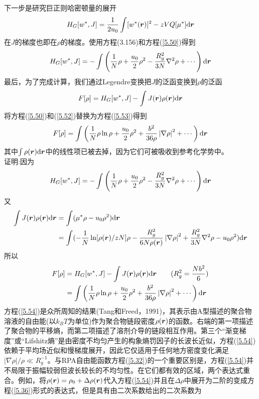 下一步是研究巨正则哈密顿量的展开
\begin{equation}
H_G[w^*,J]=\frac{1}{2u_0}\int[w^*(\bm{r})]^2-zVQ[\mu^*]\mathrm{d}\bm{r}
\end{equation}
在$J$的梯度也即在$\rho$的梯度。使用方程(3.156)和方程(\ref{5.50})得到
\begin{equation}\label{5.52}
H_G[w^*,J]=-\int\left(\frac{1}{N}\rho+\frac{u_0}{2}\rho^2-\frac{R_g^2}{3N}\nabla^2\rho+\cdots\right)\mathrm{d}\bm{r}
\end{equation}
最后，为了完成计算，我们通过Legendre变换把$J$的泛函变换到$\rho$的泛函
\begin{equation}\label{5.53}
F[\rho]=H_G[w^*,J]-\int J(\bm{r})\rho(\bm{r})\mathrm{d}\bm{r}
\end{equation}
将方程(\ref{5.50})和(\ref{5.52})替换为方程(\ref{5.53})得到
\begin{equation}\label{5.54}
F[\rho]=\int\left(\frac{1}{N}\rho\ln\rho+\frac{u_0}{2}\rho^2+\frac{b^2}{36\rho}\left|\nabla\rho\right|^2+\cdots\right)\mathrm{d}\bm{r}
\end{equation}
其中$\int\rho(\bm{r})\mathrm{d}\bm{r}$中的线性项已被去掉，因为它们可被吸收到参考化学势中。\\
证明:因为
\begin{equation*}
H_G[w^*,J]=-\int\left(\frac{1}{N}\rho+\frac{u_0}{2}\rho^2-\frac{R_g^2}{3N}\nabla^2\rho+\cdots\right)\mathrm{d}\bm{r}
\end{equation*}
又
\begin{equation*}
\begin{aligned}
\int J(\bm{r})\rho(\bm{r})\mathrm{d}\bm{r}&=\int(\mu^*\rho-u_0\rho^2)\mathrm{d}\bm{r}\\
&=\int(-\frac{1}{N}\ln[\rho(\bm{r})/zN]\rho-\frac{R_g^2}{6N\rho(\bm{r})}\left|\nabla\rho\right|^2+\frac{R_g^2}{3N}\nabla^2\rho-u_0\rho^2)\mathrm{d}\bm{r}
\end{aligned}
\end{equation*}
所以
\begin{equation*}
\begin{aligned}
F[\rho]&=H_G[w^*,J]-\int J(\bm{r})\rho(\bm{r})\mathrm{d}\bm{r}\qquad (R_g^2=\frac{Nb^2}{6})\\
&=\int\left(\frac{1}{N}\rho\ln\rho+\frac{u_0}{2}\rho^2+\frac{b^2}{36\rho}\left|\nabla\rho\right|^2+\cdots\right)\mathrm{d}\bm{r}
\end{aligned}
\end{equation*}
方程(\ref{5.54})是众所周知的结果(Tang和Freed，1991)，其表示由A型描述的聚合物溶液的自由能(以$k_BT$为单位)作为聚合物链段密度$\rho(\bm{r})$的函数。右端的第一项描述了聚合物的平移熵，而第二项描述了溶剂介导的链段相互作用。第三个“渐变梯度”或“Lifshitz熵”是由密度不均匀产生的构象熵罚因子的长波长近似，方程(\ref{5.54})依赖于平均场近似和慢梯度展开，因此它仅适用于任何地方密度变化满足$\left|\nabla\rho\right|/\rho\ll R_g^{-1}$。与RPA自由能函数方程(\ref{5.32})的一个重要区别是，方程(\ref{5.54})并不局限于振幅较弱但波长较长的不均匀性。在它们都有效的区域，两个表达式重合。例如，将$\rho(\bm{r})=\rho_0+\Delta\rho(\bm{r})$代入方程(\ref{5.54})并且在$\Delta\rho$中展开为二阶的变成方程(\ref{5.36})形式的表达式，但是具有由二次系数给出的二次系数为
